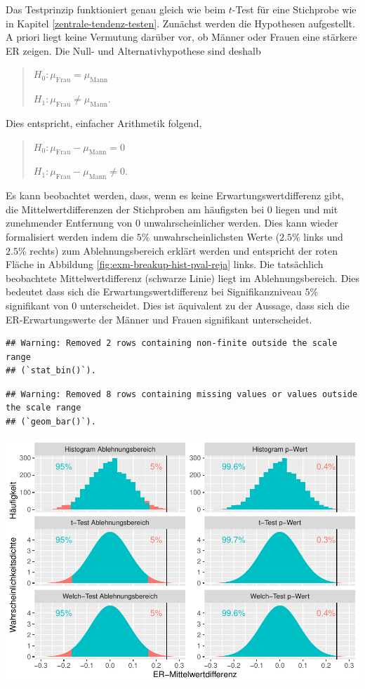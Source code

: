 \documentclass[
]{book}
\theoremstyle{definition}
\theoremstyle{definition}
\theoremstyle{definition}
\theoremstyle{definition}
\theoremstyle{remark}
\begin{document}
Das Testprinzip funktioniert genau gleich wie beim \(t\)-Test für eine Stichprobe wie in Kapitel \ref{zentrale-tendenz-testen}. Zunächst werden die Hypothesen aufgestellt. A priori liegt keine Vermutung darüber vor, ob Männer oder Frauen eine stärkere ER zeigen. Die Null- und Alternativhypothese sind deshalb

\begin{quote}
\(H_0: \mu_\text{Frau} = \mu_\text{Mann}\)

\(H_1: \mu_\text{Frau} \neq \mu_\text{Mann}.\)
\end{quote}

Dies entspricht, einfacher Arithmetik folgend,

\begin{quote}
\(H_0: \mu_\text{Frau} - \mu_\text{Mann} = 0\)

\(H_1: \mu_\text{Frau} - \mu_\text{Mann} \neq 0.\)
\end{quote}

Es kann beobachtet werden, dass, wenn es keine Erwartungswertdifferenz gibt, die Mittelwertdifferenzen der Stichproben am häufigsten bei \(0\) liegen und mit zunehmender Entfernung von \(0\) unwahrscheinlicher werden. Dies kann wieder formalisiert werden indem die \(5\%\) unwahrscheinlichsten Werte (\(2.5\%\) links und \(2.5\%\) rechts) zum Ablehnungsbereich erklärt werden und entspricht der roten Fläche in Abbildung \ref{fig:exm-breakup-hist-pval-reja} links. Die tatsächlich beobachtete Mittelwertdifferenz (schwarze Linie) liegt im Ablehnungsbereich. Dies bedeutet dass sich die Erwartungswertdifferenz bei Signifikanzniveau \(5\%\) signifikant von \(0\) unterscheidet. Dies ist äquivalent zu der Aussage, dass sich die ER-Erwartungswerte der Männer und Frauen signifikant unterscheidet.

\begin{verbatim}
## Warning: Removed 2 rows containing non-finite outside the scale range
## (`stat_bin()`).
\end{verbatim}

\begin{verbatim}
## Warning: Removed 8 rows containing missing values or values outside the scale range
## (`geom_bar()`).
\end{verbatim}

\includegraphics{aps_statistik1_files/figure-latex/exm-breakup-hist-pval-reja-1.pdf}
\end{document}
